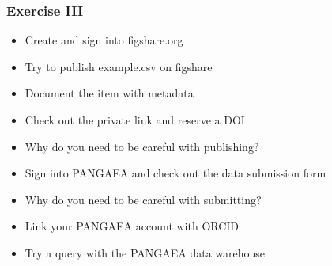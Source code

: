 \documentclass{beamer}
\begin{document}
\begin{frame}
  \frametitle{Exercise III}
  
  \begin{itemize}
  \item Create and sign into figshare.org
  \item Try to publish example.csv on figshare
  \item Document the item with metadata
  \item Check out the private link and reserve a DOI
  \item Why do you need to be careful with publishing?
  \item Sign into PANGAEA and check out the data submission form
  \item Why do you need to be careful with submitting?
  \item Link your PANGAEA account with ORCID
  \item Try a query with the PANGAEA data warehouse
  \end{itemize}
\end{frame}
\end{document}
